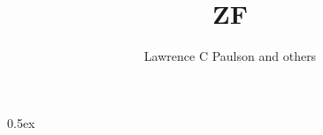 \documentclass[11pt,a4paper]{article}
\begin{document}
\title{ZF}
\author{Lawrence C Paulson and others}
\maketitle

\tableofcontents

\parindent 0pt\parskip 0.5ex



%
%
\end{document}
